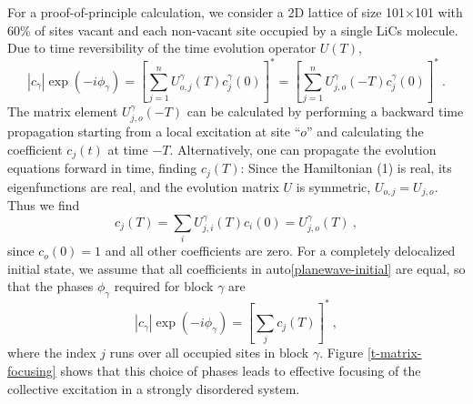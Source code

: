 For a proof-of-principle calculation, we consider a 2D lattice of size 101$\times$101 with 60\% of sites vacant and each non-vacant site occupied by a single LiCs molecule. 
Due to time reversibility of the time
evolution operator $U(T)$, 
\begin{equation}
|c_\gamma | \exp(-i \phi_{\gamma}) = \left[ \sum_{j=1}^{n} U_{o, j}^\gamma (T) c_j^{\gamma}(0)\right]^* 
=\left[ \sum_{j=1}^{n} U_{j, o}^\gamma (-T) c_j^{\gamma}(0)\right]^* \ .
\end{equation}
The matrix element $U_{j, o}^\gamma (-T)$ can be
calculated by performing a backward time propagation starting from a
local excitation at site ``$o$'' and calculating the coefficient
$c_j(t)$ at time $-T$. Alternatively, one can propagate the evolution equations forward in time, finding $c_j(T)$: 
Since the Hamiltonian (1) is real, its eigenfunctions are real, and the evolution matrix $U$ is symmetric, $U_{o, j} = U_{j, o}$. Thus we find
\begin{equation}
c_j(T) = \sum_{i}U_{j, i}^\gamma (T) c_i(0) = U_{j, o}^\gamma (T) \ ,
\end{equation}
since $c_{o}(0) = 1$ and all other coefficients are zero. For a completely delocalized initial state, we assume that all coefficients
in auto\ref{planewave-initial} are equal, so that  the phases $\phi_\gamma$ required for
block $\gamma$ are
\begin{equation}
 |c_\gamma|\exp(- i \phi_{\gamma})  = \left[ \sum_{j}  c_j(T) \right]^* \ , \label{phase-applied}
\end{equation}
where the index $j$ runs over all  occupied sites in block $\gamma$.
Figure \ref{t-matrix-focusing} shows that this choice of phases leads to effective focusing of the collective excitation in a strongly disordered system. 

